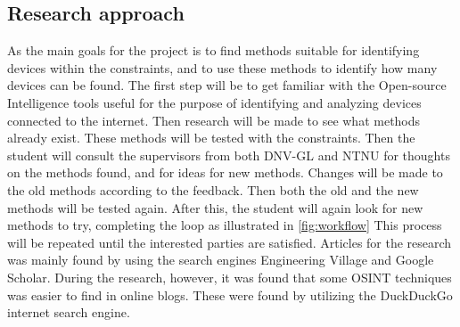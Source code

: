 \subsection{Research approach}
As the main goals for the project is to find methods suitable for identifying devices within the constraints, and to use these methods to identify how many devices can be found. The first step will be to get familiar with the Open-source Intelligence tools useful for the purpose of identifying and analyzing devices connected to the internet. Then research will be made to see what methods already exist. These methods will be tested with the constraints. Then the student will consult the supervisors from both DNV-GL and NTNU for thoughts on the methods found, and for ideas for new methods. Changes will be made to the old methods according to the feedback. Then both the old and the new methods will be tested again. After this, the student will again look for new methods to try, completing the loop as illustrated in \cref{fig:workflow} This process will be repeated until the interested parties are satisfied.
Articles for the research was mainly found by using the search engines Engineering Village\cite{engineering_village} and Google Scholar\cite{google_scholar}. During the research, however, it was found that some OSINT techniques was easier to find in online blogs. These were found by utilizing the DuckDuckGo internet search engine\cite{ddg}. 


